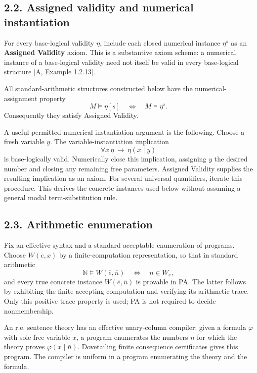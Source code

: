\documentclass[
  11pt,
  letterpaper,
]{article}
\begin{document}
\subsection{2.2. Assigned validity and numerical
instantiation}\label{assigned-validity-and-numerical-instantiation}

For every base-logical validity \(\eta\), include each closed numerical
instance \(\eta^s\) as an \textbf{Assigned Validity} axiom. This is a
substantive axiom scheme: a numerical instance of a base-logical
validity need not itself be valid in every base-logical structure {[}A,
Example 1.2.13{]}.

All standard-arithmetic structures constructed below have the
numerical-assignment property \[
M\models\eta[s]\quad\Longleftrightarrow\quad M\models\eta^s.
\tag{L3}
\] Consequently they satisfy Assigned Validity.

A useful permitted numerical-instantiation argument is the following.
Choose a fresh variable \(y\). The variable-instantiation implication \[
\forall x\,\eta\ \to\ \eta(x\mid y)
\] is base-logically valid. Numerically close this implication,
assigning \(y\) the desired number and closing any remaining free
parameters. Assigned Validity supplies the resulting implication as an
axiom. For several universal quantifiers, iterate this procedure. This
derives the concrete instances used below without assuming a general
modal term-substitution rule.

\subsection{2.3. Arithmetic enumeration}\label{arithmetic-enumeration}

Fix an effective syntax and a standard acceptable enumeration of
programs. Choose \(W(e,x)\) by a finite-computation representation, so
that in standard arithmetic \[
\mathbb N\models W(\bar e,\bar n)
\quad\Longleftrightarrow\quad n\in W_e,
\] and every true concrete instance \(W(\bar e,\bar n)\) is provable in
PA. The latter follows by exhibiting the finite accepting computation
and verifying its arithmetic trace. Only this positive trace property is
used; PA is not required to decide nonmembership.

An r.e. sentence theory has an effective unary-column compiler: given a
formula \(\varphi\) with sole free variable \(x\), a program enumerates
the numbers \(n\) for which the theory proves \(\varphi(x\mid\bar n)\).
Dovetailing finite consequence certificates gives this program. The
compiler is uniform in a program enumerating the theory and the formula.
\end{document}
